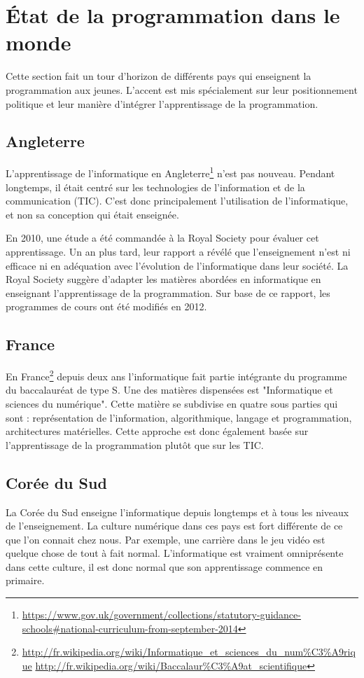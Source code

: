 \section{État de la programmation dans le monde}
\label{monde} %
Cette section fait un tour d'horizon de différents pays qui enseignent la programmation aux jeunes. L'accent est mis spécialement sur leur positionnement politique et leur manière d'intégrer l'apprentissage de la programmation.
\subsection{Angleterre}
L'apprentissage de l'informatique en Angleterre\footnote{\url{https://www.gov.uk/government/collections/statutory-guidance-schools\#national-curriculum-from-september-2014}} n'est pas nouveau. Pendant longtemps, il était centré sur les technologies de l'information et de la communication (TIC). C'est donc principalement l'utilisation de l'informatique, et non sa conception qui était enseignée.

En 2010, une étude a été commandée à la Royal Society pour évaluer cet apprentissage. Un an plus tard, leur rapport a révélé que l'enseignement n'est ni efficace ni en adéquation avec l'évolution de l'informatique dans leur société. La Royal Society suggère d'adapter les matières abordées en informatique en enseignant l'apprentissage de la programmation. Sur base de ce rapport, les programmes de cours ont été modifiés en 2012.

\subsection{France}
En France\footnote{\url{http://fr.wikipedia.org/wiki/Informatique\_et\_sciences\_du\_num\%C3\%A9rique}
\url{http://fr.wikipedia.org/wiki/Baccalaur\%C3\%A9at\_scientifique}} depuis deux ans l'informatique fait partie intégrante du programme du baccalauréat de type S. Une des matières dispensées est "Informatique et sciences du numérique". Cette matière se subdivise en quatre sous parties qui sont : représentation de l'information, algorithmique, langage et programmation, architectures matérielles. Cette approche est donc également basée sur l'apprentissage de la programmation plutôt que sur les TIC.

\subsection{Corée du Sud}
La Corée du Sud enseigne l'informatique depuis longtemps et à tous les niveaux de l'enseignement. La culture numérique dans ces pays est fort différente de ce que l'on connait chez nous. Par exemple, une carrière dans le jeu vidéo est quelque chose de tout à fait normal. L'informatique est vraiment omniprésente dans cette culture, il est donc normal que son apprentissage commence en primaire.


